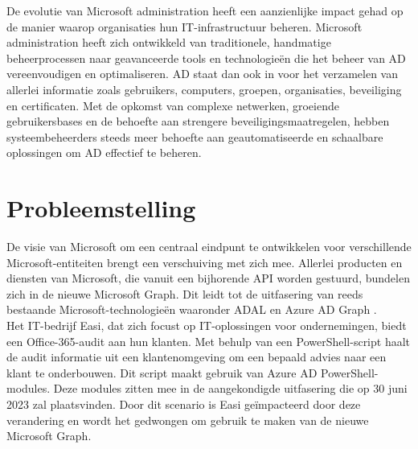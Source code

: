 De evolutie van Microsoft administration heeft een aanzienlijke impact gehad op de manier waarop organisaties hun \ac{IT}-infrastructuur beheren. Microsoft administration heeft zich ontwikkeld van traditionele, handmatige beheerprocessen naar geavanceerde tools en technologieën die het beheer van \ac{AD} vereenvoudigen en optimaliseren. \ac{AD} staat dan ook in voor het verzamelen van allerlei informatie zoals gebruikers, computers, groepen, organisaties, beveiliging en certificaten. Met de opkomst van complexe netwerken, groeiende gebruikersbases en de behoefte aan strengere beveiligingsmaatregelen, hebben systeembeheerders steeds meer behoefte aan geautomatiseerde en schaalbare oplossingen om \ac{AD} effectief te beheren. \\

\section{Probleemstelling}
\label{sec:probleemstelling}

\begin{comment}
Uit je probleemstelling moet duidelijk zijn dat je onderzoek een meerwaarde heeft voor een concrete doelgroep. De doelgroep moet goed gedefinieerd en afgelijnd zijn. Doelgroepen als ``bedrijven,'' ``KMO's'', systeembeheerders, enz.~zijn nog te vaag. Als je een lijstje kan maken van de personen/organisaties die een meerwaarde zullen vinden in deze bachelorproef (dit is eigenlijk je steekproefkader), dan is dat een indicatie dat de doelgroep goed gedefinieerd is. Dit kan een enkel bedrijf zijn of zelfs één persoon (je co-promotor/opdrachtgever).
\end{comment}

De visie van Microsoft om een centraal eindpunt te ontwikkelen voor verschillende Microsoft-entiteiten brengt een verschuiving met zich mee. Allerlei producten en diensten van Microsoft, die vanuit een bijhorende \ac{API} worden gestuurd, bundelen zich in de nieuwe Microsoft Graph. Dit leidt tot de uitfasering van reeds bestaande Microsoft-technologieën waaronder \ac{ADAL} en Azure \Ac{AD} Graph \autocite{Sahay2022}. \\

Het \ac{IT}-bedrijf Easi, dat zich focust op \ac{IT}-oplossingen voor ondernemingen, biedt een Office-365-audit aan hun klanten. Met behulp van een PowerShell-script haalt de audit informatie uit een klantenomgeving om een bepaald advies naar een klant te onderbouwen. Dit script maakt gebruik van Azure \ac{AD} PowerShell-modules. Deze modules zitten mee in de aangekondigde uitfasering die op 30 juni 2023 zal plaatsvinden. Door dit scenario is Easi geïmpacteerd door deze verandering en wordt het gedwongen om gebruik te maken van de nieuwe Microsoft Graph. \\

